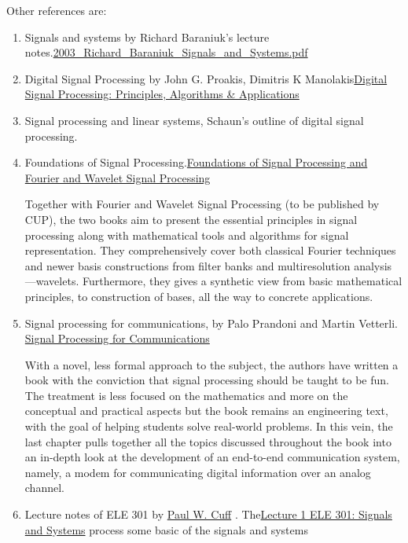 \documentclass[koma,utopia,letterpaper,captions=tableheading,11pt,listings-sv,microtype,paralist,colorlinks=true,urlcolor=blue]{org-article}
\begin{document}
Other references are:
\begin{enumerate}
\item Signals and systems by Richard Baraniuk's lecture
notes.\href{https://web.itu.edu.tr/hulyayalcin/Signal\_Processing\_Books/2003\_Richard\_Baraniuk\_Signals\_and\_Systems.pdf}{2003\_Richard\_Baraniuk\_Signals\_and\_Systems.pdf}
\item Digital Signal Processing by John G. Proakis, Dimitris K Manolakis\href{https://engineering.purdue.edu/\~ee538/DSP\_Text\_3rdEdition.pdf}{Digital Signal Processing: Principles, Algorithms \& Applications}

\item Signal processing and linear systems, Schaun's outline of digital signal
processing.
\item Foundations of Signal Processing.\href{http://fourierandwavelets.org/}{Foundations of Signal Processing and Fourier
and Wavelet Signal Processing}

Together with Fourier and Wavelet Signal Processing (to be published by CUP),
the two books aim to present the essential principles in signal processing
along with mathematical tools and algorithms for signal representation. They
comprehensively cover both classical Fourier techniques and newer basis
constructions from filter banks and multiresolution analysis—wavelets.
Furthermore, they gives a synthetic view from basic mathematical principles,
to construction of bases, all the way to concrete applications.

\item Signal processing for communications, by Palo Prandoni and Martin
Vetterli. \href{https://www.sp4comm.org/index.html}{Signal Processing for Communications}

With a novel, less formal approach to the subject, the authors have written a
book with the conviction that signal processing should be taught to be fun.
The treatment is less focused on the mathematics and more on the conceptual
and practical aspects but the book remains an engineering text, with the goal
of helping students solve real-world problems. In this vein, the last chapter
pulls together all the topics discussed throughout the book into an in-depth
look at the development of an end-to-end communication system, namely, a
modem for communicating digital information over an analog channel.

\item Lecture notes of ELE 301 by \href{https://www.princeton.edu/\~cuff/}{Paul W. Cuff} . The\href{https://www.princeton.edu/\~cuff/ele301/files/lecture1\_2.pdf}{Lecture 1 ELE 301: Signals and
Systems}  process some basic of the signals and systems


\end{enumerate}
\end{document}
